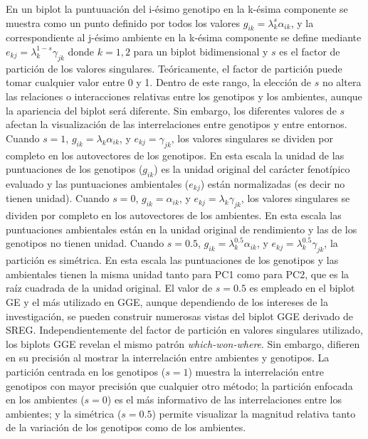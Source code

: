 En un biplot la puntuuación del i-ésimo genotipo en la k-ésima componente se muestra como un punto definido por todos los valores $g_{ik} = \lambda_k^{s} \alpha_{ik}$, y la correspondiente al j-ésimo ambiente en la k-ésima componente se define mediante $e_{kj} = \lambda_k^{1-s} \gamma_{jk}$ donde $k=1,2$ para un biplot bidimensional y $s$ es el factor de partición de los valores singulares. Teóricamente, el factor de partición puede tomar cualquier valor entre 0 y 1. Dentro de este rango, la elección de $s$ no altera las relaciones o interacciones relativas entre los genotipos y los ambientes, aunque la apariencia del biplot será diferente. Sin embargo, los diferentes valores de $s$ afectan la visualización de las interrelaciones entre genotipos y entre entornos. Cuando $s=1$, 
$g_{ik} = \lambda_k \alpha_{ik}$, y $e_{kj} = \gamma_{jk}$, los valores singulares se dividen por completo en los autovectores de los genotipos. En esta escala la unidad de las puntuaciones de los genotipos ($g_{ik}$) es la unidad original del carácter fenotípico evaluado y las puntuaciones ambientales ($e_{kj}$) están normalizadas (es decir no tienen unidad). Cuando $s=0$, $g_{ik} = \alpha_{ik}$, y $e_{kj} = \lambda_k \gamma_{jk}$, los valores singulares se dividen por completo en los autovectores de los ambientes. En esta escala las puntuaciones ambientales están en la unidad original de rendimiento y las de los genotipos no tienen unidad. Cuando $s=0.5$, $g_{ik} = \lambda_k^{0.5} \alpha_{ik}$, y $e_{kj} = \lambda_k^{0.5} \gamma_{jk}$, la partición es simétrica. En esta escala las puntuaciones de los genotipos y las ambientales tienen la misma unidad tanto para PC1 como para PC2, que es la raíz cuadrada de la unidad original. El valor de $s=0.5$ es empleado en el biplot GE y el más utilizado en GGE, aunque dependiendo de los intereses de la investigación, se pueden construir numerosas vistas del biplot GGE derivado de SREG. Independientemente del factor de partición en valores singulares utilizado, los biplots GGE revelan el mismo patrón \emph{which-won-where}. Sin embargo, difieren en su precisión al mostrar la interrelación entre ambientes y genotipos. La partición centrada en los genotipos ($s=1$) muestra la interrelación entre genotipos con mayor precisión que cualquier otro método; la partición enfocada en los ambientes ($s=0$) es el más informativo de las interrelaciones entre los ambientes; y la simétrica ($s=0.5$) permite visualizar la magnitud relativa tanto de la variación de los genotipos como de los ambientes. 




